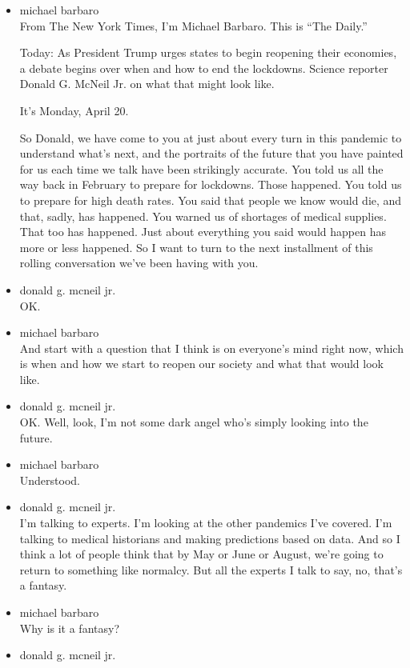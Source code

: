\begin{itemize}
\item
  michael barbaro\\
  From The New York Times, I'm Michael Barbaro. This is ``The Daily.''

  Today: As President Trump urges states to begin reopening their
  economies, a debate begins over when and how to end the lockdowns.
  Science reporter Donald G. McNeil Jr. on what that might look like.

  It's Monday, April 20.

  So Donald, we have come to you at just about every turn in this
  pandemic to understand what's next, and the portraits of the future
  that you have painted for us each time we talk have been strikingly
  accurate. You told us all the way back in February to prepare for
  lockdowns. Those happened. You told us to prepare for high death
  rates. You said that people we know would die, and that, sadly, has
  happened. You warned us of shortages of medical supplies. That too has
  happened. Just about everything you said would happen has more or less
  happened. So I want to turn to the next installment of this rolling
  conversation we've been having with you.
\item
  donald g. mcneil jr.\\
  OK.
\item
  michael barbaro\\
  And start with a question that I think is on everyone's mind right
  now, which is when and how we start to reopen our society and what
  that would look like.
\item
  donald g. mcneil jr.\\
  OK. Well, look, I'm not some dark angel who's simply looking into the
  future.
\item
  michael barbaro\\
  Understood.
\item
  donald g. mcneil jr.\\
  I'm talking to experts. I'm looking at the other pandemics I've
  covered. I'm talking to medical historians and making predictions
  based on data. And so I think a lot of people think that by May or
  June or August, we're going to return to something like normalcy. But
  all the experts I talk to say, no, that's a fantasy.
\item
  michael barbaro\\
  Why is it a fantasy?
\item
  donald g. mcneil jr.\\

\end{itemize}
